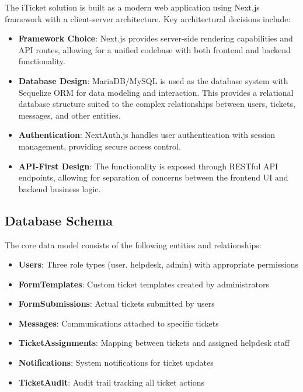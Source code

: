 \documentclass[12pt,a4paper]{article}
\begin{document}
The iTicket solution is built as a modern web application using Next.js framework with a client-server architecture. Key architectural decisions include:

\begin{itemize}
    \item \textbf{Framework Choice}: Next.js provides server-side rendering capabilities and API routes, allowing for a unified codebase with both frontend and backend functionality.
    
    \item \textbf{Database Design}: MariaDB/MySQL is used as the database system with Sequelize ORM for data modeling and interaction. This provides a relational database structure suited to the complex relationships between users, tickets, messages, and other entities.
    
    \item \textbf{Authentication}: NextAuth.js handles user authentication with session management, providing secure access control.
    
    \item \textbf{API-First Design}: The functionality is exposed through RESTful API endpoints, allowing for separation of concerns between the frontend UI and backend business logic.
\end{itemize}

\subsection{Database Schema}

The core data model consists of the following entities and relationships:

\begin{itemize}
    \item \textbf{Users}: Three role types (user, helpdesk, admin) with appropriate permissions
    \item \textbf{FormTemplates}: Custom ticket templates created by administrators
    \item \textbf{FormSubmissions}: Actual tickets submitted by users
    \item \textbf{Messages}: Communications attached to specific tickets
    \item \textbf{TicketAssignments}: Mapping between tickets and assigned helpdesk staff
    \item \textbf{Notifications}: System notifications for ticket updates
    \item \textbf{TicketAudit}: Audit trail tracking all ticket actions
\end{itemize}
\end{document}
